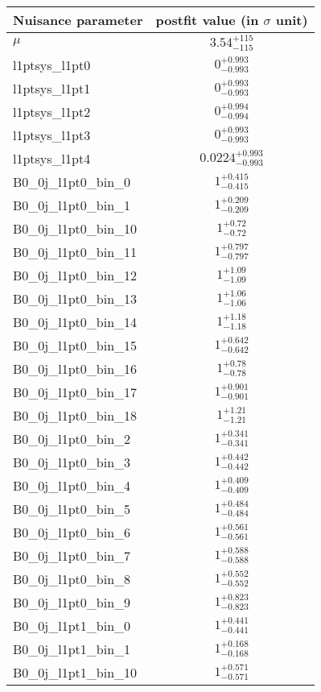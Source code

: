 
\begin{tabular}{|l|c|}
\hline
Nuisance parameter & postfit value (in $\sigma$ unit) \\\hline
$\mu$ & $3.54^{+115}_{-115}$ \\
l1ptsys\_l1pt0 & $0^{+0.993}_{-0.993}$ \\
l1ptsys\_l1pt1 & $0^{+0.993}_{-0.993}$ \\
l1ptsys\_l1pt2 & $0^{+0.994}_{-0.994}$ \\
l1ptsys\_l1pt3 & $0^{+0.993}_{-0.993}$ \\
l1ptsys\_l1pt4 & $0.0224^{+0.993}_{-0.993}$ \\
B0\_0j\_l1pt0\_bin\_0 & $1^{+0.415}_{-0.415}$ \\
B0\_0j\_l1pt0\_bin\_1 & $1^{+0.209}_{-0.209}$ \\
B0\_0j\_l1pt0\_bin\_10 & $1^{+0.72}_{-0.72}$ \\
B0\_0j\_l1pt0\_bin\_11 & $1^{+0.797}_{-0.797}$ \\
B0\_0j\_l1pt0\_bin\_12 & $1^{+1.09}_{-1.09}$ \\
B0\_0j\_l1pt0\_bin\_13 & $1^{+1.06}_{-1.06}$ \\
B0\_0j\_l1pt0\_bin\_14 & $1^{+1.18}_{-1.18}$ \\
B0\_0j\_l1pt0\_bin\_15 & $1^{+0.642}_{-0.642}$ \\
B0\_0j\_l1pt0\_bin\_16 & $1^{+0.78}_{-0.78}$ \\
B0\_0j\_l1pt0\_bin\_17 & $1^{+0.901}_{-0.901}$ \\
B0\_0j\_l1pt0\_bin\_18 & $1^{+1.21}_{-1.21}$ \\
B0\_0j\_l1pt0\_bin\_2 & $1^{+0.341}_{-0.341}$ \\
B0\_0j\_l1pt0\_bin\_3 & $1^{+0.442}_{-0.442}$ \\
B0\_0j\_l1pt0\_bin\_4 & $1^{+0.409}_{-0.409}$ \\
B0\_0j\_l1pt0\_bin\_5 & $1^{+0.484}_{-0.484}$ \\
B0\_0j\_l1pt0\_bin\_6 & $1^{+0.561}_{-0.561}$ \\
B0\_0j\_l1pt0\_bin\_7 & $1^{+0.588}_{-0.588}$ \\
B0\_0j\_l1pt0\_bin\_8 & $1^{+0.552}_{-0.552}$ \\
B0\_0j\_l1pt0\_bin\_9 & $1^{+0.823}_{-0.823}$ \\
B0\_0j\_l1pt1\_bin\_0 & $1^{+0.441}_{-0.441}$ \\
B0\_0j\_l1pt1\_bin\_1 & $1^{+0.168}_{-0.168}$ \\
B0\_0j\_l1pt1\_bin\_10 & $1^{+0.571}_{-0.571}$ \\

\end{tabular}
